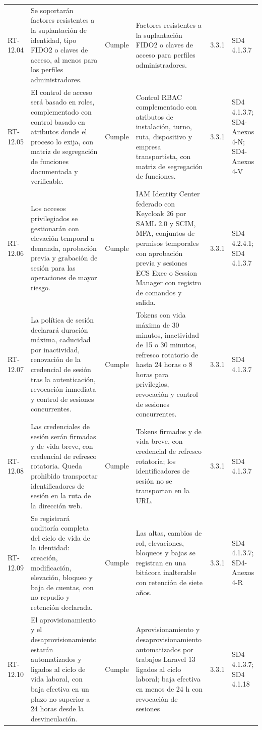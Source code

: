 \documentclass[carta,firma,final]{lafrox}
\begin{document}
\begin{landscape}
{\begin{longtable}{@{}F{0.070} F{0.255} F{0.075} F{0.280} F{0.090} F{0.230}@{}}
  RT-12.04 & Se soportarán factores resistentes a la suplantación de identidad, tipo FIDO2 o claves de acceso, al menos para los perfiles administradores. & Cumple & Factores resistentes a la suplantación FIDO2 o claves de acceso para perfiles administradores. & 3.3.1 & SD4 4.1.3.7 \\
  RT-12.05 & El control de acceso será basado en roles, complementado con control basado en atributos donde el proceso lo exija, con matriz de segregación de funciones documentada y verificable. & Cumple & Control RBAC complementado con atributos de instalación, turno, ruta, dispositivo y empresa transportista, con matriz de segregación de funciones. & 3.3.1 & SD4 4.1.3.7; SD4-Anexos 4-N; SD4-Anexos 4-V \\
  RT-12.06 & Los accesos privilegiados se gestionarán con elevación temporal a demanda, aprobación previa y grabación de sesión para las operaciones de mayor riesgo. & Cumple & IAM Identity Center federado con Keycloak 26 por SAML 2.0 y SCIM, MFA, conjuntos de permisos temporales con aprobación previa y sesiones ECS Exec o Session Manager con registro de comandos y salida. & 3.3.1 & SD4 4.2.4.1; SD4 4.1.3.7 \\
  RT-12.07 & La política de sesión declarará duración máxima, caducidad por inactividad, renovación de la credencial de sesión tras la autenticación, revocación inmediata y control de sesiones concurrentes. & Cumple & Tokens con vida máxima de 30 minutos, inactividad de 15 o 30 minutos, refresco rotatorio de hasta 24 horas o 8 horas para privilegios, revocación y control de sesiones concurrentes. & 3.3.1 & SD4 4.1.3.7 \\
  RT-12.08 & Las credenciales de sesión serán firmadas y de vida breve, con credencial de refresco rotatoria. Queda prohibido transportar identificadores de sesión en la ruta de la dirección web. & Cumple & Tokens firmados y de vida breve, con credencial de refresco rotatoria; los identificadores de sesión no se transportan en la URL. & 3.3.1 & SD4 4.1.3.7 \\
  RT-12.09 & Se registrará auditoría completa del ciclo de vida de la identidad: creación, modificación, elevación, bloqueo y baja de cuentas, con no repudio y retención declarada. & Cumple & Las altas, cambios de rol, elevaciones, bloqueos y bajas se registran en una bitácora inalterable con retención de siete años. & 3.3.1 & SD4 4.1.3.7; SD4-Anexos 4-R \\
  RT-12.10 & El aprovisionamiento y el desaprovisionamiento estarán automatizados y ligados al ciclo de vida laboral, con baja efectiva en un plazo no superior a 24 horas desde la desvinculación. & Cumple & Aprovisionamiento y desaprovisionamiento automatizados por trabajos Laravel 13 ligados al ciclo laboral; baja efectiva en menos de 24 h con revocación de sesiones & 3.3.1 & SD4 4.1.3.7; SD4 4.1.18 \\

\end{longtable}}
\end{landscape}
\end{document}
